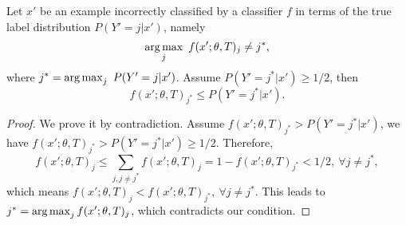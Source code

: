 \begin{lemma}
\label{lemma: model-probability-coefficient}
Let $x'$ be an example incorrectly classified by a classifier $f$ in terms of the true label distribution $P(Y'=j|x')$, namely
$$
\operatorname*{arg\,max}_j~f(x'; \theta, T)_j \ne j^*,
$$
where $j^* = \operatorname*{arg\,max}_j ~P(Y'=j|x')$. Assume $P(Y' = j^* | x') \ge 1/2$,
then 
$$ f(x'; \theta, T)_{j^*}  \le P(Y' = j^* | x').$$
\end{lemma}

\begin{proof}
We prove it by contradiction.
Assume $f(x'; \theta, T)_{j^*}  > P(Y' = j^* | x')$, we have $f(x'; \theta, T)_{j^*} > P(Y' = j^* | x') \ge 1/2$. Therefore,
$$
f(x'; \theta, T)_j \le \sum_{j, j\ne j^*} f(x'; \theta, T)_j = 1 - f(x'; \theta, T)_{j^*} < 1/2, ~ \forall j \ne j^*,
$$
which means $f(x'; \theta, T)_j < f(x'; \theta, T)_{j^*}, ~\forall j\ne j^*$. This leads to $j^* = \operatorname*{arg\,max}_j f(x'; \theta, T)_j$, which contradicts our condition.
\end{proof}



